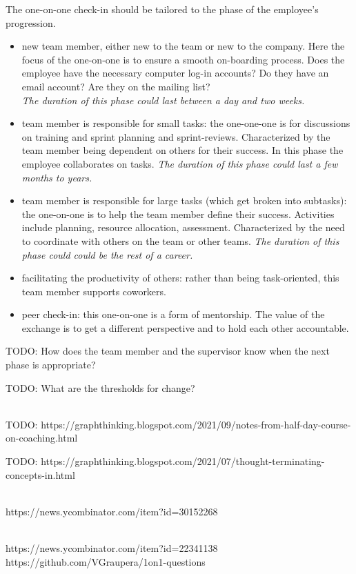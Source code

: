 The one-on-one check-in should be tailored to the phase of the employee's progression. 
\begin{itemize}
    \item new team member, either new to the team or new to the company. Here the focus of the one-on-one is to ensure a smooth on-boarding process. Does the employee have the necessary computer log-in accounts? Do they have an email account? Are they on the mailing list?\\
\textit{The duration of this phase could last between a day and two weeks.}
    \item team member is responsible for small tasks: the one-one-one is for discussions on training and sprint planning and sprint-reviews. Characterized by the team member being dependent on others for their success. In this phase the employee collaborates on tasks.
\textit{The duration of this phase could last a few months to years.}
    \item team member is responsible for large tasks (which get broken into subtasks): the one-on-one is to help the team member define their success. Activities include planning, resource allocation, assessment. Characterized by the need to coordinate with others on the team or other teams.
\textit{The duration of this phase could could be the rest of a career.}
    \item facilitating the productivity of others: rather than being task-oriented, this team member supports coworkers. 
    \item peer check-in: this one-on-one is a form of mentorship. The value of the exchange is to get a different perspective and to hold each other accountable.
\end{itemize}

TODO: How does the team member and the supervisor know when the next phase is appropriate?

TODO: What are the thresholds for change?

\ \\

TODO: https://graphthinking.blogspot.com/2021/09/notes-from-half-day-course-on-coaching.html

TODO: https://graphthinking.blogspot.com/2021/07/thought-terminating-concepts-in.html

\ \\

https://news.ycombinator.com/item?id=30152268

\ \\

https://news.ycombinator.com/item?id=22341138
https://github.com/VGraupera/1on1-questions

